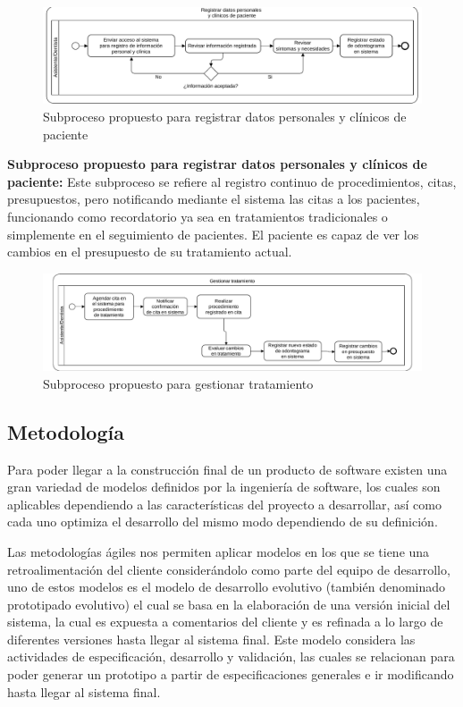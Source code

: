 \begin{figure}[H]
\centering
\centerline{\includegraphics[width=18.5cm, keepaspectratio]{pictures/picture12.pdf}}
\caption{Subproceso propuesto para registrar datos personales y clínicos de paciente}
\end{figure}

\noindent\textbf{Subproceso propuesto para registrar datos personales y clínicos de paciente:} Este subproceso se refiere al registro continuo de procedimientos, citas, presupuestos, pero notificando mediante el sistema las citas a los pacientes, funcionando como recordatorio ya sea en tratamientos tradicionales o simplemente en el seguimiento de pacientes. El paciente es capaz de ver los cambios en el presupuesto de su tratamiento actual.

\begin{figure}[H]
\centering
\centerline{\includegraphics[width=18.5cm, keepaspectratio]{pictures/picture13.pdf}}
\caption{Subproceso propuesto para gestionar tratamiento}
\end{figure}

\newpage
\subsection{Metodología}

Para poder llegar a la construcción final de un producto de software existen una gran variedad de modelos definidos por la ingeniería de software, los cuales son aplicables dependiendo a las características del proyecto a desarrollar, así como cada uno optimiza el desarrollo del mismo modo dependiendo de su definición\cite{A01}. 

\vspace{1em}

Las metodologías ágiles nos permiten aplicar modelos en los que se tiene una retroalimentación del cliente considerándolo como parte del equipo de desarrollo, uno de estos modelos es el modelo de desarrollo evolutivo (también denominado prototipado evolutivo) el cual se basa en la elaboración de una versión inicial del sistema, la cual es expuesta a comentarios del cliente y es refinada a lo largo de diferentes versiones hasta llegar al sistema final. Este modelo considera las actividades de especificación, desarrollo y validación, las cuales se relacionan para poder generar un prototipo a partir de especificaciones generales e ir modificando hasta llegar al sistema final\cite{A07}.

